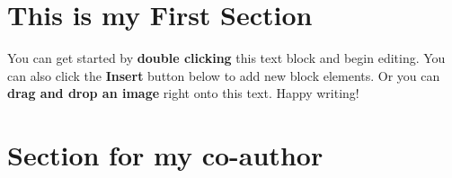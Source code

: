 


\section{This is my First Section}

You can get started by \textbf{double clicking} this text block and begin editing. You can also click the \textbf{Insert} button below to add new block elements. Or you can \textbf{drag and drop an image} right onto this text. Happy writing!

\section{Section for my co-author}



